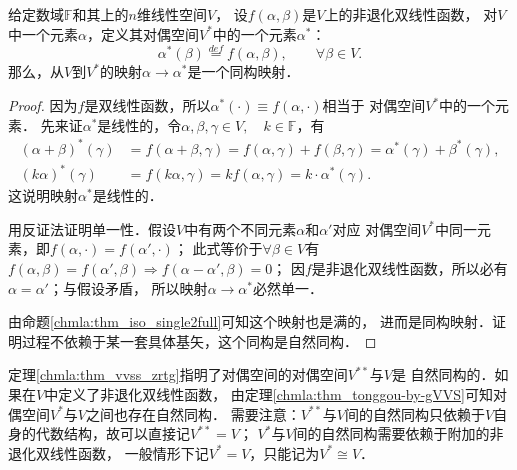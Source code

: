 \begin{theorem}\label{chmla:thm_tonggou-by-gVVS}
    给定数域$\mathbb{F}$和其上的$n$维线性空间$V$，
    设$f(\alpha,\beta)$是$V$上的非退化双线性函数，
    对$V$中一个元素$\alpha$，定义其对偶空间$V^{*}$中的一个元素$\alpha^*$：
    \begin{equation}
        \alpha^{*}(\beta) \overset{def}{=} f(\alpha,\beta),
        \qquad \forall \beta \in V.
    \end{equation}
    那么，从$V$到$V^*$的映射$\alpha \to \alpha^*$是一个同构映射．
\end{theorem}
\begin{proof}
    因为$f$是双线性函数，所以$\alpha^*(\cdot) \equiv f(\alpha,\cdot)$相当于
    对偶空间$V^*$中的一个元素．
    先来证$\alpha^*$是线性的，令$\alpha,\beta,\gamma \in V, \quad k\in \mathbb{F}$，有
    \begin{align*}
        (\alpha+\beta)^*(\gamma)&=f(\alpha+\beta,\gamma)
        =f(\alpha,\gamma)+f(\beta,\gamma)
        =\alpha^{*}(\gamma)+ \beta^{*}(\gamma), \\
        (k \alpha)^* (\gamma)&=f(k \alpha,\gamma) =kf(\alpha,\gamma)=k\cdot \alpha^*(\gamma) .
    \end{align*}
    这说明映射$\alpha^*$是线性的．

    用反证法证明单一性．假设$V$中有两个不同元素$\alpha$和$\alpha'$对应
    对偶空间$V^*$中同一元素，即$f(\alpha,\cdot)=f(\alpha',\cdot)$；
    此式等价于$\forall \beta \in V$有
    $f(\alpha,\beta)=f(\alpha',\beta)\Rightarrow f(\alpha-\alpha',\beta)=0$；
    因$f$是非退化双线性函数，所以必有$\alpha=\alpha'$；与假设矛盾，
    所以映射$\alpha \to \alpha^*$必然单一．

    由命题\ref{chmla:thm_iso_single2full}可知这个映射也是满的，
    进而是同构映射．证明过程不依赖于某一套具体基矢，这个同构是{\heiti 自然同构}．
\end{proof}
\begin{remark}
    定理\ref{chmla:thm_vvss_zrtg}指明了对偶空间的对偶空间$V^{**}$与$V$是
    自然同构的．如果在$V$中定义了非退化双线性函数，
    由定理\ref{chmla:thm_tonggou-by-gVVS}可知对偶空间$V^{*}$与$V$之间也存在自然同构．
    需要注意：$V^{**}$与$V$间的自然同构只依赖于$V$自身的代数结构，故可以直接记$V^{**}=V$；
    $V^{*}$与$V$间的自然同构需要依赖于附加的非退化双线性函数，
    一般情形下记$V^{*}=V$，只能记为$V^{*} \cong V$．
\end{remark}



